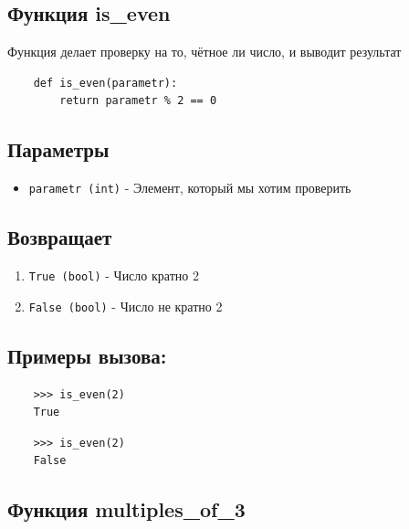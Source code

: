 \documentclass{article}
\begin{document}

    \hrulefill
    
    \subsection{Функция is\_even}
    
    Функция делает проверку на то, чётное ли число, и выводит результат
    
    \begin{verbatim}
    def is_even(parametr):
        return parametr % 2 == 0
    \end{verbatim}
    
    \subsection*{Параметры}
        \begin{itemize}
            \item \texttt{parametr (int)} - Элемент, который мы хотим проверить
        \end{itemize}
        
        \subsection*{Возвращает}
        \begin{enumerate}
            \item \texttt{True (bool)} -  Число кратно 2
            \item \texttt{False (bool)} - Число не кратно 2
        \end{enumerate}
    
    
    \subsection*{Примеры вызова:}
        \begin{verbatim}
    >>> is_even(2)
    True
        \end{verbatim}

        \begin{verbatim}
    >>> is_even(2)
    False
        \end{verbatim}


    \hrulefill

    \subsection{Функция multiples\_of\_3}
    
\end{document}
